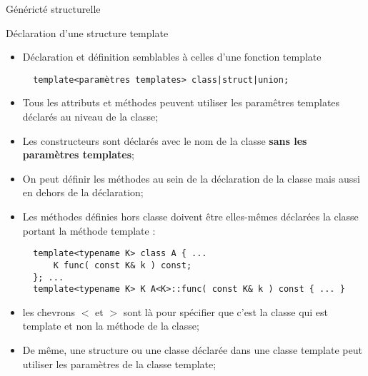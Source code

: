 \documentclass[compress,10pt,aspectratio=169]{beamer}
\begin{document}
\begin{frame}[fragile]{Généricté structurelle}
  \scriptsize
  \begin{block}{\small Déclaration d'une structure template}
  \begin{itemize}
  \item Déclaration et définition semblables à celles d'une fonction template
  \begin{verbatim}
  template<paramètres templates> class|struct|union;
  \end{verbatim}
  \item Tous les attributs et méthodes peuvent utiliser les paramêtres templates 
        déclarés au niveau de la classe;
  \item Les constructeurs sont déclarés avec le nom de la classe \textbf{sans les paramètres templates};
  \item On peut définir les méthodes au sein de la déclaration de la classe mais aussi en dehors de la déclaration;
  \item Les méthodes définies hors classe doivent être elles-mêmes déclarées la classe portant la méthode template :
  \begin{verbatim}
  template<typename K> class A { ...
      K func( const K& k ) const;
  }; ...
  template<typename K> K A<K>::func( const K& k ) const { ... }
  \end{verbatim}
  \item les chevrons $<$ et $>$ sont là pour spécifier que c'est la classe qui est template et non la méthode de la classe;
  \item De même, une structure ou une classe déclarée dans une classe template peut
        utiliser les paramètres de la classe template;
\end{itemize}
\end{block}
\end{frame}
\end{document}
